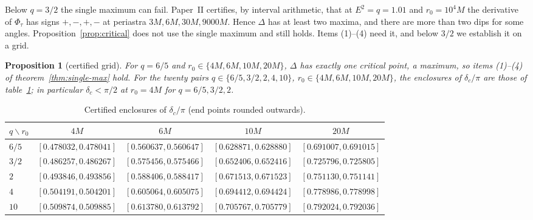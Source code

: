 \documentclass[aip,jmp,amsmath,amssymb,reprint]{revtex4-2}
\theoremstyle{plain}
\newtheorem{proposition}{Proposition}[section]
\theoremstyle{definition}
\begin{document}
Below $q=3/2$ the single maximum can fail. Paper~II certifies, by interval arithmetic, that
at $E^2=q=1.01$ and $r_0=10^4M$ the derivative of $\Phi_\tau$ has signs $+,-,+,-$ at
periastra $3M,6M,30M,9000M$. Hence $\Delta$ has at least two maxima, and there are more than
two dips for some angles. Proposition~\ref{prop:critical} does not use the single maximum
and still holds. Items (1)--(4) need it, and below $3/2$ we establish it on a grid.

\begin{proposition}[certified grid]\label{prop:certified}
For $q=6/5$ and $r_0\in\{4M,6M,10M,20M\}$, $\Delta$ has exactly one critical point, a
maximum, so items (1)--(4) of theorem~\ref{thm:single-max} hold. For the twenty pairs
$q\in\{6/5,3/2,2,4,10\}$, $r_0\in\{4M,6M,10M,20M\}$, the enclosures of $\delta_c/\pi$ are
those of table~\ref{tab:deltac}; in particular $\delta_c<\pi/2$ at $r_0=4M$ for
$q=6/5,3/2,2$.
\end{proposition}

\begin{table}[h]
\centering
\caption{Certified enclosures of $\delta_c/\pi$ (end points rounded outwards).}
\label{tab:deltac}
\small\setlength{\tabcolsep}{4pt}
\begin{tabular}{lcccc}
\hline
$q\backslash r_0$ & $4M$ & $6M$ & $10M$ & $20M$\\
\hline
$6/5$ & $[0.478032,0.478041]$ & $[0.560637,0.560647]$ & $[0.628871,0.628880]$ & $[0.691007,0.691015]$\\
$3/2$ & $[0.486257,0.486267]$ & $[0.575456,0.575466]$ & $[0.652406,0.652416]$ & $[0.725796,0.725805]$\\
$2$   & $[0.493846,0.493856]$ & $[0.588406,0.588417]$ & $[0.671513,0.671523]$ & $[0.751130,0.751141]$\\
$4$   & $[0.504191,0.504201]$ & $[0.605064,0.605075]$ & $[0.694412,0.694424]$ & $[0.778986,0.778998]$\\
$10$  & $[0.509874,0.509885]$ & $[0.613780,0.613792]$ & $[0.705767,0.705779]$ & $[0.792024,0.792036]$\\
\hline
\end{tabular}
\end{table}
\end{document}
